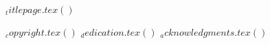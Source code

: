 
$_titlepage.tex()$

\doublespacing
{} \setcounter{page}{2}

\singlespacing
$_copyright.tex()$
$_dedication.tex()$
$_acknowledgments.tex()$